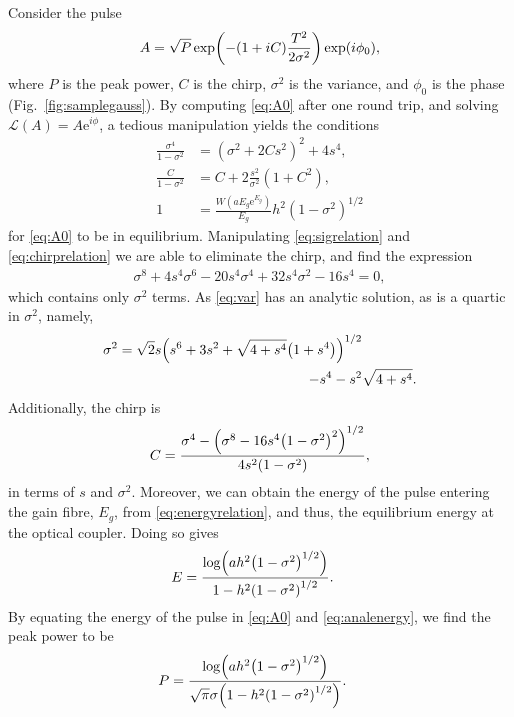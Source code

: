 \documentclass[9pt,twocolumn,twoside]{osajnl}
\let\originalleft\left
\let\originalright\right
\renewcommand{\left}{\mathopen{}\mathclose\bgroup\originalleft}
\renewcommand{\right}{\aftergroup\egroup\originalright}
\begin{document}
Consider the pulse
\begin{align}
	A = \sqrt{P} \exp \left( -(1 + iC) \frac{T^2}{2 \sigma^2} \right) \exp(i \phi_0),
	\label{eq:A0}
\end{align}
where $P$ is the peak power, $C$ is the chirp, $\sigma^2$ is the variance, and $\phi_0$ is the phase (Fig.~\ref{fig:samplegauss}). By computing \eqref{eq:A0} after one round trip, and solving $\mathcal{L}(A) = A \textrm{e}^{i \phi}$, a tedious manipulation yields the conditions
\begin{align}
	\frac{\sigma^4}{1 - \sigma^2} &= (\sigma^2 + 2 C s^2)^2 + 4 s^4, \label{eq:sigrelation} \\
	\frac{C}{1 - \sigma^2} &= C + 2 \frac{s^2}{\sigma^2} (1 + C^2), \label{eq:chirprelation} \\
	1 &= \frac{W(a E_g \textrm{e}^{E_g})}{E_g} h^2 (1 - \sigma^2)^{1/2} \label{eq:energyrelation}
\end{align}
for \eqref{eq:A0} to be in equilibrium. Manipulating \eqref{eq:sigrelation} and \eqref{eq:chirprelation} we are able to eliminate the chirp, and find the expression
\begin{align}
	\sigma^8 + 4 s^4 \sigma^6 - 20 s^4 \sigma^4 + 32 s^4 \sigma^2 - 16 s^4 = 0,
	\label{eq:var}
\end{align}
which contains only $\sigma^2$ terms. As \eqref{eq:var} has an analytic solution, as is a quartic in $\sigma^2$, namely,
\begin{equation}
	\begin{split}
		\sigma^2 = \sqrt{2} s \left( s^6 + 3s^2 + \sqrt{4 + s^4} \left( 1 + s^4 \right) \right)^{1/2} & \\
		- s^4 - s^2 & \sqrt{4 + s^4}.
		\label{eq:equilvar}
	\end{split}
\end{equation}
Additionally, the chirp is
\begin{align}
	C = \frac{\sigma^4 - \left( \sigma^8 - 16 s^4 \left( 1 - \sigma^2 \right)^2 \right)^{1/2}}{4 s^2 \left( 1 - \sigma^2 \right)},
	\label{eq:chirp}
\end{align}
in terms of $s$ and $\sigma^2$. Moreover, we can obtain the energy of the pulse entering the gain fibre, $E_g$, from \eqref{eq:energyrelation}, and thus, the equilibrium energy at the optical coupler. Doing so gives
\begin{align}
	E &= \frac{\log \left( a h^2 \left( 1 - \sigma^2 \right)^{1/2} \right)}{1 - h^2 \left( 1 - \sigma^2 \right)^{1/2}}.
	\label{eq:analenergy}
\end{align}
By equating the energy of the pulse in \eqref{eq:A0} and \eqref{eq:analenergy}, we find the peak power to be
\begin{align}
	P &= \frac{\log \left( a h^2 \left( 1 - \sigma^2 \right)^{1/2} \right)}{\sqrt{\pi} \sigma \left( 1 - h^2 \left( 1 - \sigma^2 \right)^{1/2} \right)}.
	\label{eq:analpower}
\end{align}
\end{document}
